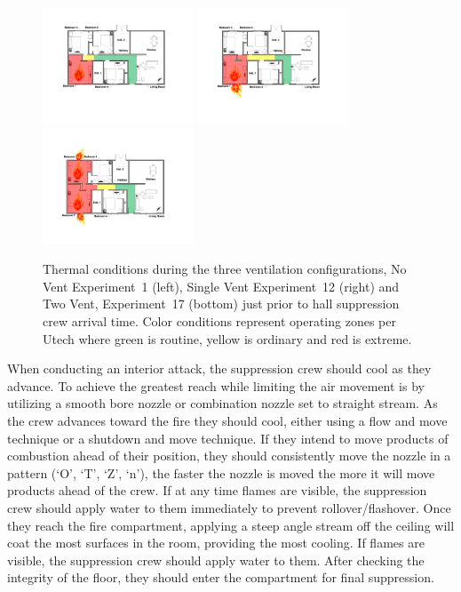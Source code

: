 \documentclass[12pt,oneside]{book}
\begin{document}
\begin{figure}[H]
\centering
\includegraphics[width=0.4\textwidth]{../0_Images/Tactical_Considerations/Cool_While_Advancing/No_Vent}
\includegraphics[width=0.4\textwidth]{../0_Images/Tactical_Considerations/Cool_While_Advancing/Single_Vent}
\includegraphics[width=0.4\textwidth]{../0_Images/Tactical_Considerations/Cool_While_Advancing/Two_Vent}
\caption[Thermal Conditions - Prior to Attack]{Thermal conditions during the three ventilation configurations, No Vent Experiment~1 (left), Single Vent Experiment~12 (right) and Two Vent, Experiment~17 (bottom) just prior to hall suppression crew arrival time. Color conditions represent operating zones per Utech \cite{Utech_Firefighter_Clothing} where green is routine, yellow is ordinary and red is extreme.}
\label{fig:Thermal_Classes_Approach_Delayed}
\end{figure}

When conducting an interior attack, the suppression crew should cool as they advance. To achieve the greatest reach while limiting the air movement is by utilizing a smooth bore nozzle or combination nozzle set to straight stream. As the crew advances toward the fire they should cool, either using a flow and move technique or a shutdown and move technique. If they intend to move products of combustion ahead of their position, they should consistently move the nozzle in a pattern (`O', `T', `Z', `n'), the faster the nozzle is moved the more it will move products ahead of the crew. If at any time flames are visible, the suppression crew should apply water to them immediately to prevent rollover/flashover. Once they reach the fire compartment, applying a steep angle stream off the ceiling will coat the most surfaces in the room, providing the most cooling. If flames are visible, the suppression crew should apply water to them. After checking the integrity of the floor, they should enter the compartment for final suppression.
\end{document}
